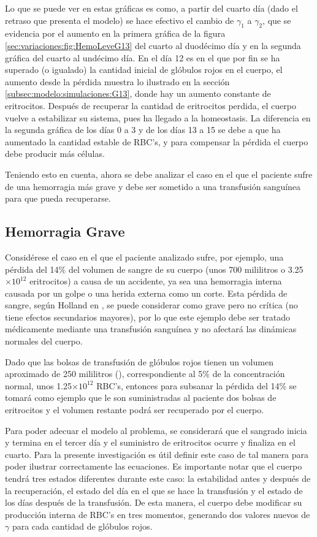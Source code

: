 Lo que se puede ver en estas gráficas es como, a partir del cuarto día (dado el retraso que presenta el modelo) se hace efectivo el cambio de $\gamma_1$ a $\gamma_2$, que se evidencia por el aumento en la primera gráfica de la figura \ref{sec:variaciones:fig:HemoLeveG13} del cuarto al duodécimo día y en la segunda gráfica del cuarto al undécimo día. En el día 12 es en el que por fin se ha superado (o igualado) la cantidad inicial de glóbulos rojos en el cuerpo, el aumento desde la pérdida muestra lo ilustrado en la sección \ref{subsec:modelo:simulaciones:G13}, donde hay un aumento constante de eritrocitos. Después de recuperar la cantidad de eritrocitos perdida, el cuerpo vuelve a estabilizar su sistema, pues ha llegado a la homeostasis. La diferencia en la segunda gráfica de los días 0 a 3 y de los días 13 a 15 se debe a que ha aumentado la cantidad estable de RBC's, y para compensar la pérdida el cuerpo debe producir más células.

Teniendo esto en cuenta, ahora se debe analizar el caso en el que el paciente sufre de una hemorragia más grave y debe ser sometido a una transfusión sanguínea para que pueda recuperarse.

\subsection{Hemorragia Grave}\label{subsec:variaciones:hemorragia:grave}

Considérese el caso en el que el paciente analizado sufre, por ejemplo, una pérdida del 14$\%$ del volumen de sangre de su cuerpo (unos 700 mililitros o 3.25$\times 10^{12}$ eritrocitos) a causa de un accidente, ya sea una hemorragia interna causada por un golpe o una herida externa como un corte. Esta pérdida de sangre, según Holland en \cite{PerdidaSangre}, se puede considerar como grave pero no crítica (no tiene efectos secundarios mayores), por lo que este ejemplo debe ser tratado médicamente mediante una transfusión sanguínea y no afectará las dinámicas normales del cuerpo.

Dado que las bolsas de transfusión de glóbulos rojos tienen un volumen aproximado de 250 mililitros (\cite{Granada}), correspondiente al 5$\%$ de la concentración normal, unos 1.25$\times 10^{12}$ RBC's, entonces para subsanar la pérdida del 14$\%$ se tomará como ejemplo que le son suministradas al paciente dos bolsas de eritrocitos y el volumen restante podrá ser recuperado por el cuerpo.

Para poder adecuar el modelo al problema, se considerará que el sangrado inicia y termina en el tercer día y el suministro de eritrocitos ocurre y finaliza en el cuarto. Para la presente investigación es útil definir este caso de tal manera para poder ilustrar correctamente las ecuaciones. Es importante notar que el cuerpo tendrá tres estados diferentes durante este caso: la estabilidad antes y después de la recuperación, el estado del día en el que se hace la transfusión y el estado de los días después de la transfusión. De esta manera, el cuerpo debe modificar su producción interna de RBC's en tres momentos, generando dos valores nuevos de $\gamma$ para cada cantidad de glóbulos rojos.

